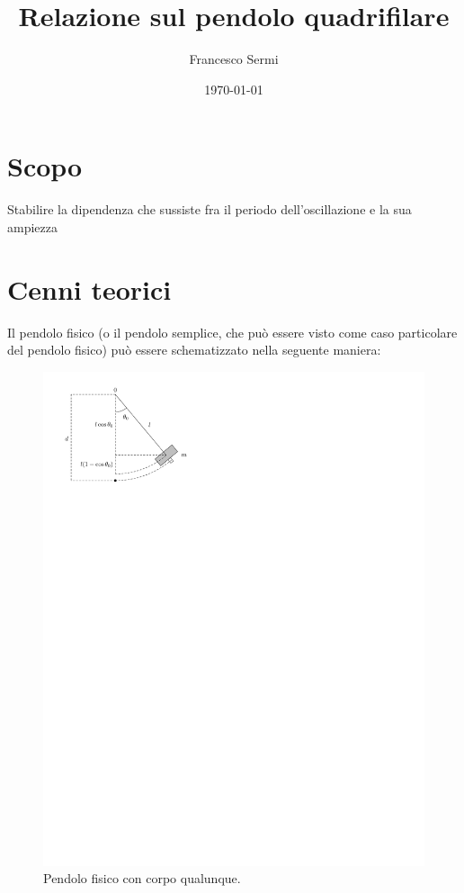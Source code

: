 \documentclass{article}
\title{Relazione sul pendolo quadrifilare}
\author{Francesco Sermi}
\date{\today}
\begin{document}
	\maketitle
	\newpage
	\tableofcontents
	\newpage
	\section{Scopo}
		Stabilire la dipendenza che sussiste fra il periodo dell'oscillazione e la sua ampiezza
	\section{Cenni teorici}
	Il pendolo fisico (o il pendolo semplice, che può essere visto come caso particolare del pendolo fisico) può essere schematizzato nella seguente maniera:
	\begin{figure}[htbp]
		\centering
  		\includegraphics[scale=0.70]{pendolo_fisico_2.pdf}
  		\caption{Pendolo fisico con corpo qualunque.}
  		\label{fig:pendolo}
	\end{figure}
\end{document}
